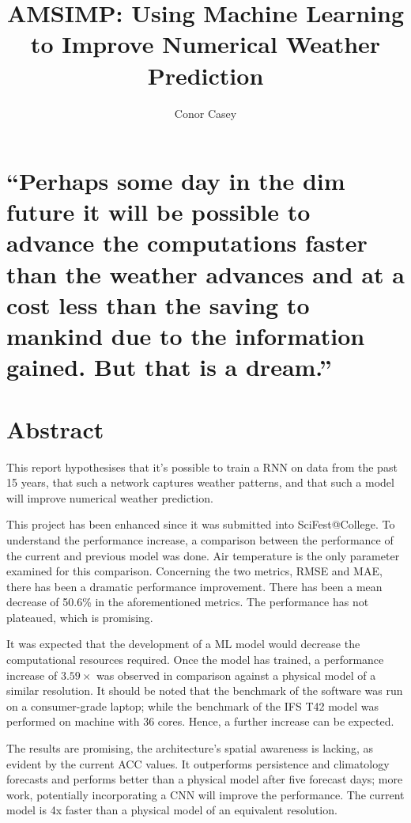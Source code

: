 \documentclass[hidelinks, 12pt]{style}
\title{AMSIMP: Using Machine Learning to Improve Numerical Weather Prediction}
\author{Conor Casey}
\begin{document}

\maketitle

\chapter*{
\centering
    ``Perhaps some day in the dim future it will be possible to advance the computations faster than the weather advances and at a cost less than the saving to mankind due to the information gained. But that is a dream.”
\\[5pt]
}

\chapter*{Abstract}
This report hypothesises that it's possible to train a RNN on data from the past 15 years, that such a network captures weather patterns, and that such a model will improve numerical weather prediction.

This project has been enhanced since it was submitted into SciFest@College. To understand the performance increase, a comparison between the performance of the current and previous model was done. Air temperature is the only parameter examined for this comparison. Concerning the two metrics, RMSE and MAE, there has been a dramatic performance improvement. There has been a mean decrease of 50.6\% in the aforementioned metrics. The performance has not plateaued, which is promising.

It was expected that the development of a ML model would decrease the computational resources required. Once the model has trained, a performance increase of $3.59\times$ was observed in comparison against a physical model of a similar resolution. It should be noted that the benchmark of the software was run on a consumer-grade laptop; while the benchmark of the IFS T42 model was performed on machine with 36 cores. Hence, a further increase can be expected.

The results are promising, the architecture's spatial awareness is lacking, as evident by the current ACC values. It outperforms persistence and climatology forecasts and performs better than a physical model after five forecast days; more work, potentially incorporating a CNN will improve the performance. The current model is 4x faster than a physical model of an equivalent resolution.
\end{document}
